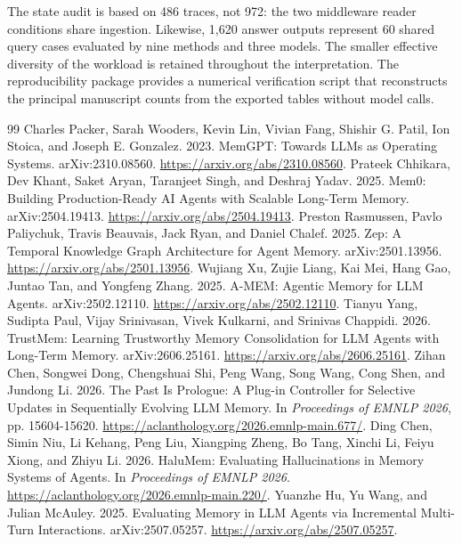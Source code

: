 \documentclass[11pt,a4paper]{article}
\begin{document}
The state audit is based on 486 traces, not 972: the two middleware reader conditions share ingestion. Likewise, 1,620 answer outputs represent 60 shared query cases evaluated by nine methods and three models. The smaller effective diversity of the workload is retained throughout the interpretation. The reproducibility package provides a numerical verification script that reconstructs the principal manuscript counts from the exported tables without model calls.

\begin{thebibliography}{99}
 Charles Packer, Sarah Wooders, Kevin Lin, Vivian Fang, Shishir G. Patil, Ion Stoica, and Joseph E. Gonzalez. 2023. MemGPT: Towards LLMs as Operating Systems. \mbox{\textnormal{arXiv:2310.08560}}. \url{https://arxiv.org/abs/2310.08560}.
 Prateek Chhikara, Dev Khant, Saket Aryan, Taranjeet Singh, and Deshraj Yadav. 2025. Mem0: Building Production-Ready AI Agents with Scalable Long-Term Memory. \mbox{\textnormal{arXiv:2504.19413}}. \url{https://arxiv.org/abs/2504.19413}.
 Preston Rasmussen, Pavlo Paliychuk, Travis Beauvais, Jack Ryan, and Daniel Chalef. 2025. Zep: A Temporal Knowledge Graph Architecture for Agent Memory. \mbox{\textnormal{arXiv:2501.13956}}. \url{https://arxiv.org/abs/2501.13956}.
 Wujiang Xu, Zujie Liang, Kai Mei, Hang Gao, Juntao Tan, and Yongfeng Zhang. 2025. A-MEM: Agentic Memory for LLM Agents. \mbox{\textnormal{arXiv:2502.12110}}. \url{https://arxiv.org/abs/2502.12110}.
 Tianyu Yang, Sudipta Paul, Vijay Srinivasan, Vivek Kulkarni, and Srinivas Chappidi. 2026. TrustMem: Learning Trustworthy Memory Consolidation for LLM Agents with Long-Term Memory. \mbox{\textnormal{arXiv:2606.25161}}. \url{https://arxiv.org/abs/2606.25161}.
 Zihan Chen, Songwei Dong, Chengshuai Shi, Peng Wang, Song Wang, Cong Shen, and Jundong Li. 2026. The Past Is Prologue: A Plug-in Controller for Selective Updates in Sequentially Evolving LLM Memory. In \emph{Proceedings of EMNLP 2026}, pp. 15604-15620. \url{https://aclanthology.org/2026.emnlp-main.677/}.
 Ding Chen, Simin Niu, Li Kehang, Peng Liu, Xiangping Zheng, Bo Tang, Xinchi Li, Feiyu Xiong, and Zhiyu Li. 2026. HaluMem: Evaluating Hallucinations in Memory Systems of Agents. In \emph{Proceedings of EMNLP 2026}. \url{https://aclanthology.org/2026.emnlp-main.220/}.
 Yuanzhe Hu, Yu Wang, and Julian McAuley. 2025. Evaluating Memory in LLM Agents via Incremental Multi-Turn Interactions. \mbox{\textnormal{arXiv:2507.05257}}. \url{https://arxiv.org/abs/2507.05257}.

\end{thebibliography}
\end{document}
